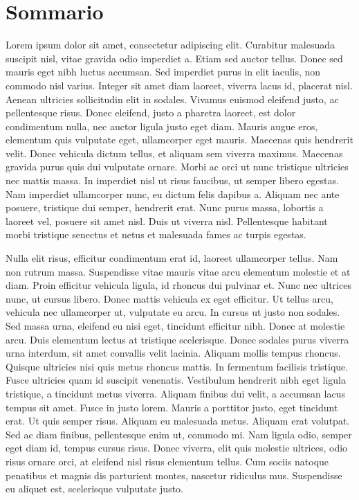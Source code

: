 \chapter{Sommario}

Lorem ipsum dolor sit amet, consectetur adipiscing elit. Curabitur malesuada suscipit nisl, vitae gravida odio imperdiet a. Etiam sed auctor tellus. Donec sed mauris eget nibh luctus accumsan. Sed imperdiet purus in elit iaculis, non commodo nisl varius. Integer sit amet diam laoreet, viverra lacus id, placerat nisl. Aenean ultricies sollicitudin elit in sodales. Vivamus euismod eleifend justo, ac pellentesque risus. Donec eleifend, justo a pharetra laoreet, est dolor condimentum nulla, nec auctor ligula justo eget diam. Mauris augue eros, elementum quis vulputate eget, ullamcorper eget mauris.
Maecenas quis hendrerit velit. Donec vehicula dictum tellus, et aliquam sem viverra maximus. Maecenas gravida purus quis dui vulputate ornare. Morbi ac orci ut nunc tristique ultricies nec mattis massa. In imperdiet nisl ut risus faucibus, ut semper libero egestas. Nam imperdiet ullamcorper nunc, eu dictum felis dapibus a. Aliquam nec ante posuere, tristique dui semper, hendrerit erat. Nunc purus massa, lobortis a laoreet vel, posuere sit amet nisl. Duis ut viverra nisl. Pellentesque habitant morbi tristique senectus et netus et malesuada fames ac turpis egestas.

Nulla elit risus, efficitur condimentum erat id, laoreet ullamcorper tellus. Nam non rutrum massa. Suspendisse vitae mauris vitae arcu elementum molestie et at diam. Proin efficitur vehicula ligula, id rhoncus dui pulvinar et. Nunc nec ultrices nunc, ut cursus libero. Donec mattis vehicula ex eget efficitur. Ut tellus arcu, vehicula nec ullamcorper ut, vulputate eu arcu. In cursus ut justo non sodales. Sed massa urna, eleifend eu nisi eget, tincidunt efficitur nibh. Donec at molestie arcu. Duis elementum lectus at tristique scelerisque. Donec sodales purus viverra urna interdum, sit amet convallis velit lacinia. Aliquam mollis tempus rhoncus. Quisque ultricies nisi quis metus rhoncus mattis.
In fermentum facilisis tristique. Fusce ultricies quam id suscipit venenatis. Vestibulum hendrerit nibh eget ligula tristique, a tincidunt metus viverra. Aliquam finibus dui velit, a accumsan lacus tempus sit amet. Fusce in justo lorem. Mauris a porttitor justo, eget tincidunt erat. Ut quis semper risus. Aliquam eu malesuada metus. Aliquam erat volutpat. Sed ac diam finibus, pellentesque enim ut, commodo mi. Nam ligula odio, semper eget diam id, tempus cursus risus. Donec viverra, elit quis molestie ultrices, odio risus ornare orci, at eleifend nisl risus elementum tellus. Cum sociis natoque penatibus et magnis dis parturient montes, nascetur ridiculus mus. Suspendisse eu aliquet est, scelerisque vulputate justo.

